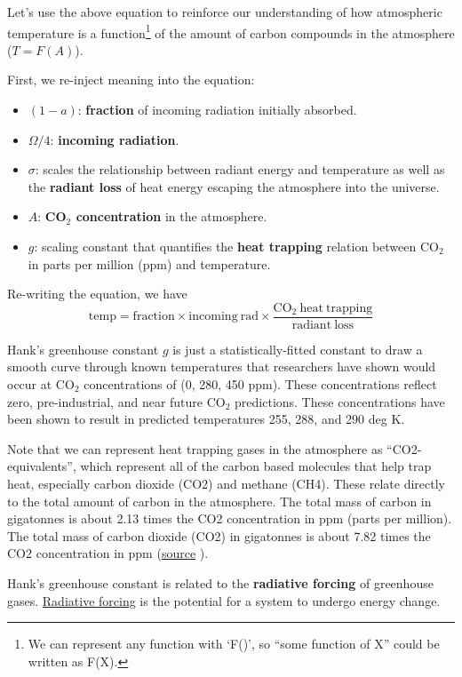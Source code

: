 \documentclass[
  letterpaper,
  DIV=11,
  numbers=noendperiod]{scrreprt}
\providecommand{\tightlist}{%
  \setlength{\itemsep}{0pt}\setlength{\parskip}{0pt}}
\begin{document}
Let's use the above equation to reinforce our understanding of how
atmospheric temperature is a function\footnote{We can represent any
  function with `F()', so ``some function of X'' could be written as
  F(X).} of the amount of carbon compounds in the atmosphere
(\(T = F(A)\)).

First, we re-inject meaning into the equation:

\begin{itemize}
\tightlist
\item
  \((1-a)\): \textbf{fraction} of incoming radiation initially absorbed.
\item
  \(\Omega/4\): \textbf{incoming radiation}.
\item
  \(\sigma\): scales the relationship between radiant energy and
  temperature as well as the \textbf{radiant loss} of heat energy
  escaping the atmosphere into the universe.
\item
  \(A\): \textbf{CO\(_2\) concentration} in the atmosphere.
\item
  \(g\): scaling constant that quantifies the \textbf{heat trapping}
  relation between CO\(_2\) in parts per million (ppm) and temperature.
\end{itemize}

Re-writing the equation, we have
\[ \mathrm{temp = fraction \times incoming~rad \times} \frac{\mathrm{CO}_2~ \mathrm{heat~trapping}}{\mathrm{radiant~loss}}\]

Hank's greenhouse constant \(g\) is just a statistically-fitted constant
to draw a smooth curve through known temperatures that researchers have
shown would occur at CO\(_2\) concentrations of (0, 280, 450 ppm). These
concentrations reflect zero, pre-industrial, and near future CO\(_2\)
predictions. These concentrations have been shown to result in predicted
temperatures 255, 288, and 290 deg K.

Note that we can represent heat trapping gases in the atmosphere as
``CO2-equivalents'', which represent all of the carbon based molecules
that help trap heat, especially carbon dioxide (CO2) and methane (CH4).
These relate directly to the total amount of carbon in the atmosphere.
The total mass of carbon in gigatonnes is about 2.13 times the CO2
concentration in ppm (parts per million). The total mass of carbon
dioxide (CO2) in gigatonnes is about 7.82 times the CO2 concentration in
ppm
(\href{*https://en.wikipedia.org/wiki/Carbon_dioxide_in_Earth\%27s_atmosphere}{source}
).

Hank's greenhouse constant is related to the \textbf{radiative forcing}
of greenhouse gases.
\href{https://en.wikipedia.org/wiki/Radiative_forcing}{Radiative
forcing} is the potential for a system to undergo energy change.
\end{document}
